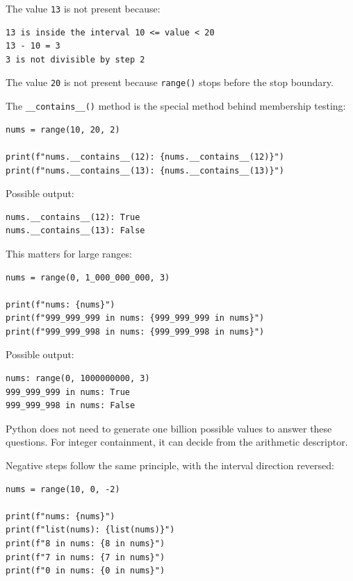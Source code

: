 \documentclass[a4paper,twoside]{report}
\begin{document}
The value \texttt{13} is not present because:

\begin{verbatim}
13 is inside the interval 10 <= value < 20
13 - 10 = 3
3 is not divisible by step 2
\end{verbatim}

The value \texttt{20} is not present because \texttt{range()} stops before the stop boundary.

The \texttt{\_\_contains\_\_()} method is the special method behind membership testing:

\begin{verbatim}
nums = range(10, 20, 2)

print(f"nums.__contains__(12): {nums.__contains__(12)}")
print(f"nums.__contains__(13): {nums.__contains__(13)}")
\end{verbatim}

Possible output:

\begin{verbatim}
nums.__contains__(12): True
nums.__contains__(13): False
\end{verbatim}

This matters for large ranges:

\begin{verbatim}
nums = range(0, 1_000_000_000, 3)

print(f"nums: {nums}")
print(f"999_999_999 in nums: {999_999_999 in nums}")
print(f"999_999_998 in nums: {999_999_998 in nums}")
\end{verbatim}

Possible output:

\begin{verbatim}
nums: range(0, 1000000000, 3)
999_999_999 in nums: True
999_999_998 in nums: False
\end{verbatim}

Python does not need to generate one billion possible values to answer these questions. For integer containment, it can decide from the arithmetic descriptor.

Negative steps follow the same principle, with the interval direction reversed:

\begin{verbatim}
nums = range(10, 0, -2)

print(f"nums: {nums}")
print(f"list(nums): {list(nums)}")
print(f"8 in nums: {8 in nums}")
print(f"7 in nums: {7 in nums}")
print(f"0 in nums: {0 in nums}")
\end{verbatim}
\end{document}
